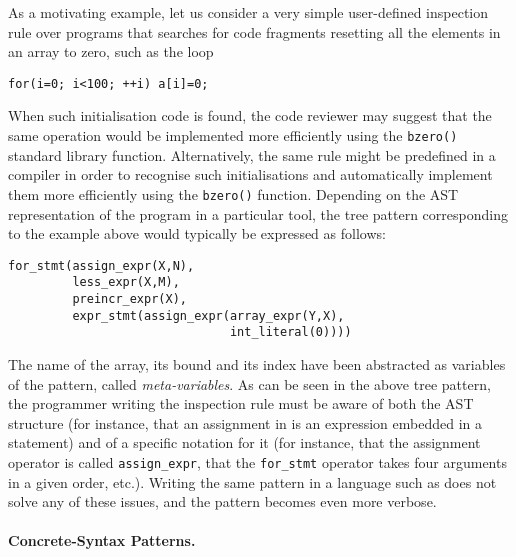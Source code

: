 As a motivating example, let us consider a very simple
user\hyp{}defined inspection rule over \Clang programs that searches
for code fragments resetting all the elements in an array to zero,
such as the loop
\begin{verbatim}
for(i=0; i<100; ++i) a[i]=0;
\end{verbatim}
\noindent When such initialisation code is found, the code reviewer
may suggest that the same operation would be implemented more
efficiently using the \texttt{bzero()} standard library
function. Alternatively, the same rule might be predefined in a
compiler in order to recognise such initialisations and automatically
implement them more efficiently using the \texttt{bzero()}
function. Depending on the AST representation of the \Clang program
in a particular tool, the tree pattern corresponding to the example
above would typically be expressed as follows: 
{\small
\begin{verbatim}
for_stmt(assign_expr(X,N),
         less_expr(X,M),
         preincr_expr(X),
         expr_stmt(assign_expr(array_expr(Y,X),
                               int_literal(0))))
\end{verbatim}
}
\noindent The name of the array, its bound and its index have been
abstracted as variables of the pattern, called
\emph{meta\hyp{}variables}. As can be seen in the above tree pattern,
the programmer writing the inspection rule must be aware of both the
AST structure (for instance, that an assignment in \Clang is an
expression embedded in a statement) and of a specific notation for it
(for instance, that the assignment operator is called
\texttt{assign\_expr}, that the \texttt{for\_stmt} operator takes four
arguments in a given order, etc.). Writing the same pattern in a
language such as \XPath does not solve any of these issues, and the
pattern becomes even more verbose.

\paragraph{Concrete\hyp{}Syntax Patterns.}

